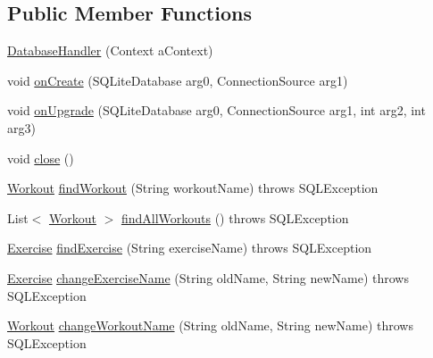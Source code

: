\subsection*{Public Member Functions}
\begin{DoxyCompactItemize}
\item 
\hyperlink{classcom_1_1example_1_1workoutcompanion_1_1db_1_1_database_handler_a70557f69e2eed6ec8a586c57ad6c5148}{Database\-Handler} (Context a\-Context)
\item 
void \hyperlink{classcom_1_1example_1_1workoutcompanion_1_1db_1_1_database_handler_ae8b1c67a6abc49ee420227fa24d54420}{on\-Create} (S\-Q\-Lite\-Database arg0, Connection\-Source arg1)
\item 
void \hyperlink{classcom_1_1example_1_1workoutcompanion_1_1db_1_1_database_handler_ac806115da11f781668b749a3c73e645b}{on\-Upgrade} (S\-Q\-Lite\-Database arg0, Connection\-Source arg1, int arg2, int arg3)
\item 
void \hyperlink{classcom_1_1example_1_1workoutcompanion_1_1db_1_1_database_handler_a89c6c6effa783f1873ebbcb9b301c6d8}{close} ()
\item 
\hyperlink{classcom_1_1example_1_1workoutcompanion_1_1dom_1_1_workout}{Workout} \hyperlink{classcom_1_1example_1_1workoutcompanion_1_1db_1_1_database_handler_aad77efaa1ca2fecbac8ef4b0c283fa12}{find\-Workout} (String workout\-Name)  throws S\-Q\-L\-Exception 
\item 
List$<$ \hyperlink{classcom_1_1example_1_1workoutcompanion_1_1dom_1_1_workout}{Workout} $>$ \hyperlink{classcom_1_1example_1_1workoutcompanion_1_1db_1_1_database_handler_a0375493d23c0dd16988f5b375b87be9b}{find\-All\-Workouts} ()  throws S\-Q\-L\-Exception 
\item 
\hyperlink{classcom_1_1example_1_1workoutcompanion_1_1dom_1_1_exercise}{Exercise} \hyperlink{classcom_1_1example_1_1workoutcompanion_1_1db_1_1_database_handler_af529635c9fad7b21b1f2afb17a0ca17f}{find\-Exercise} (String exercise\-Name)  throws S\-Q\-L\-Exception 
\item 
\hyperlink{classcom_1_1example_1_1workoutcompanion_1_1dom_1_1_exercise}{Exercise} \hyperlink{classcom_1_1example_1_1workoutcompanion_1_1db_1_1_database_handler_aa6f903c2616f7863bdf5199d43d955d3}{change\-Exercise\-Name} (String old\-Name, String new\-Name)  throws S\-Q\-L\-Exception 
\item 
\hyperlink{classcom_1_1example_1_1workoutcompanion_1_1dom_1_1_workout}{Workout} \hyperlink{classcom_1_1example_1_1workoutcompanion_1_1db_1_1_database_handler_acbc08344a1d529bfee3ff7c159126511}{change\-Workout\-Name} (String old\-Name, String new\-Name)  throws S\-Q\-L\-Exception 

\end{DoxyCompactItemize}

